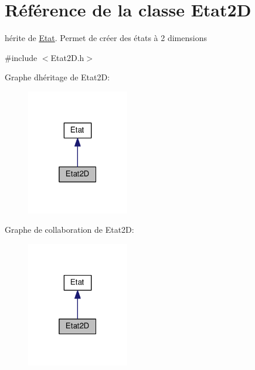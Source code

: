 \hypertarget{class_etat2_d}{}\section{Référence de la classe Etat2D}
\label{class_etat2_d}


hérite de \hyperlink{class_etat}{Etat}. Permet de créer des états à 2 dimensions  




{\ttfamily \#include $<$Etat2\+D.\+h$>$}



Graphe d\textquotesingle{}héritage de Etat2D\+:
\nopagebreak
\begin{figure}[H]
\begin{center}
\leavevmode
\includegraphics[width=127pt]{class_etat2_d__inherit__graph}
\end{center}
\end{figure}


Graphe de collaboration de Etat2D\+:
\nopagebreak
\begin{figure}[H]
\begin{center}
\leavevmode
\includegraphics[width=127pt]{class_etat2_d__coll__graph}
\end{center}
\end{figure}
